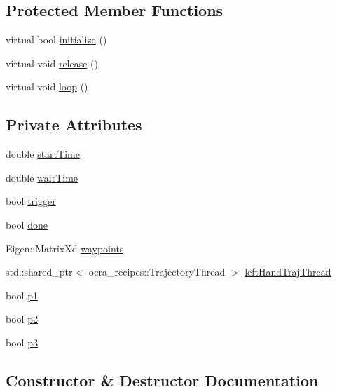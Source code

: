 \subsection*{Protected Member Functions}
\begin{DoxyCompactItemize}
\item 
virtual bool \hyperlink{classExampleClient_ad504d1d87997fc95bfeca6aa925a4fa6}{initialize} ()
\item 
virtual void \hyperlink{classExampleClient_a5acf25784c1c5b51c2c085327f195002}{release} ()
\item 
virtual void \hyperlink{classExampleClient_afb58f3425aafe2d4c38195cb3c667dbc}{loop} ()
\end{DoxyCompactItemize}
\subsection*{Private Attributes}
\begin{DoxyCompactItemize}
\item 
double \hyperlink{classExampleClient_aaa5ec782e9aaa1e94d7182872f743c02}{start\+Time}
\item 
double \hyperlink{classExampleClient_acade7035d4e39290cbda08b98249a629}{wait\+Time}
\item 
bool \hyperlink{classExampleClient_a90ce0c4d970c903b3e6afb6f5ca2a228}{trigger}
\item 
bool \hyperlink{classExampleClient_acd2cf0f0479ff8bbf5b64924d83beb60}{done}
\item 
Eigen\+::\+Matrix\+Xd \hyperlink{classExampleClient_acf4657277ecb08168d9a17c208814823}{waypoints}
\item 
std\+::shared\+\_\+ptr$<$ ocra\+\_\+recipes\+::\+Trajectory\+Thread $>$ \hyperlink{classExampleClient_a4311b0e8c4878c23df2b5ba048d8bc05}{left\+Hand\+Traj\+Thread}
\item 
bool \hyperlink{classExampleClient_a7fb2b50cbdac0ec3a32e44b5bbc3b11f}{p1}
\item 
bool \hyperlink{classExampleClient_a07c2bc5c5c522e77a726017c28db2ec9}{p2}
\item 
bool \hyperlink{classExampleClient_ab41df6f34a51e649051adbac6d3077f9}{p3}
\end{DoxyCompactItemize}


\subsection{Constructor \& Destructor Documentation}
\hypertarget{classExampleClient_aed7d851662cba1484ecf1db8161d6e62}{}\label{classExampleClient_aed7d851662cba1484ecf1db8161d6e62} 

